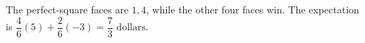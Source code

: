 The perfect-square faces are $ 1,4 $, while the other four faces win. The expectation is $\dfrac{4}{6}(5)+\dfrac{2}{6}(-3)=\boxed{\dfrac{7}{3}\text{ dollars}}$.
